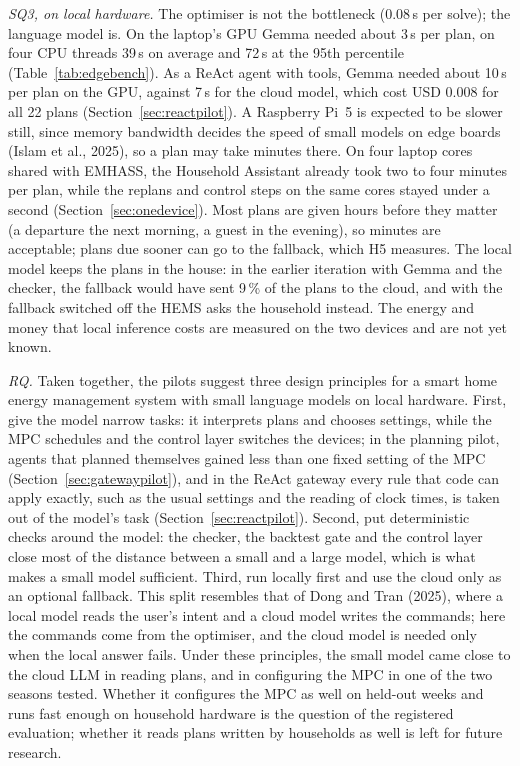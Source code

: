 \documentclass[12pt,a4paper]{report}
\begin{document}
\textit{SQ3, on local hardware.} The optimiser is not the bottleneck
(0.08\,s per solve); the language model is. On the laptop's GPU Gemma
needed about 3\,s per plan, on four CPU threads 39\,s on average and
72\,s at the 95th percentile (Table~\ref{tab:edgebench}). As a ReAct
agent with tools, Gemma needed about 10\,s per plan on the GPU, against
7\,s for the cloud model, which cost USD 0.008 for all 22 plans
(Section~\ref{sec:reactpilot}). A Raspberry
Pi~5 is expected to be slower still, since memory bandwidth decides the
speed of small models on edge boards (Islam et al., 2025), so a plan
may take minutes there. On four laptop cores shared with EMHASS, the
Household Assistant already took two to four minutes per plan, while
the replans and control steps on the same cores stayed under a second
(Section~\ref{sec:onedevice}). Most plans are given hours before they matter
(a departure the next morning, a guest in the evening), so minutes are
acceptable; plans due sooner can go to the fallback, which H5 measures.
The local model keeps the plans in the house: in the earlier iteration
with Gemma and the checker, the fallback would have sent 9\,\% of the
plans to the cloud,
and with the fallback switched off the HEMS asks the household instead.
The energy and money that local inference costs are measured on the two
devices and are not yet known.

\textit{RQ.} Taken together, the pilots suggest three design principles
for a smart home energy management system with small language models on
local hardware. First, give the model narrow tasks: it interprets plans
and chooses settings, while the MPC schedules and the control layer
switches the devices; in the planning pilot, agents that planned
themselves gained less than one fixed setting of the MPC
(Section~\ref{sec:gatewaypilot}), and in the ReAct gateway every rule
that code can apply exactly, such as the usual settings and the reading
of clock times, is taken out of the model's task
(Section~\ref{sec:reactpilot}). Second, put deterministic checks
around the model: the checker, the backtest gate and the control layer
close most of the distance between a small and a large model, which is
what makes a small model sufficient. Third, run locally first and use
the cloud only as an optional fallback. This split resembles that of
Dong and Tran (2025), where a local model reads the user's intent and a
cloud model writes the commands; here the commands come from the
optimiser, and the cloud model is needed only when the local answer
fails. Under these principles, the small model came close to the cloud
LLM in reading plans, and in configuring the MPC in one of the two
seasons tested. Whether it configures the MPC as well on held-out weeks
and runs fast enough on household hardware is the question of the
registered evaluation; whether it reads plans written by households as
well is left for future research.
\end{document}

